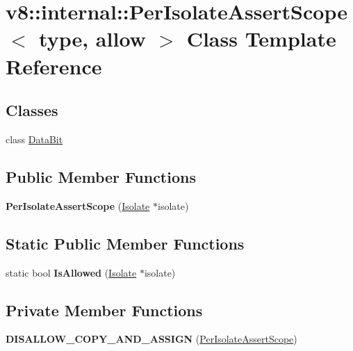 \hypertarget{classv8_1_1internal_1_1_per_isolate_assert_scope}{}\section{v8\+:\+:internal\+:\+:Per\+Isolate\+Assert\+Scope$<$ type, allow $>$ Class Template Reference}
\label{classv8_1_1internal_1_1_per_isolate_assert_scope}
\subsection*{Classes}
\begin{DoxyCompactItemize}
\item 
class \hyperlink{classv8_1_1internal_1_1_per_isolate_assert_scope_1_1_data_bit}{Data\+Bit}
\end{DoxyCompactItemize}
\subsection*{Public Member Functions}
\begin{DoxyCompactItemize}
\item 
{\bfseries Per\+Isolate\+Assert\+Scope} (\hyperlink{classv8_1_1internal_1_1_isolate}{Isolate} $\ast$isolate)\hypertarget{classv8_1_1internal_1_1_per_isolate_assert_scope_afbc3795af325ea428c90ef81665cb5e2}{}\label{classv8_1_1internal_1_1_per_isolate_assert_scope_afbc3795af325ea428c90ef81665cb5e2}

\end{DoxyCompactItemize}
\subsection*{Static Public Member Functions}
\begin{DoxyCompactItemize}
\item 
static bool {\bfseries Is\+Allowed} (\hyperlink{classv8_1_1internal_1_1_isolate}{Isolate} $\ast$isolate)\hypertarget{classv8_1_1internal_1_1_per_isolate_assert_scope_a11578ac71c68b5d24a690956e50b740f}{}\label{classv8_1_1internal_1_1_per_isolate_assert_scope_a11578ac71c68b5d24a690956e50b740f}

\end{DoxyCompactItemize}
\subsection*{Private Member Functions}
\begin{DoxyCompactItemize}
\item 
{\bfseries D\+I\+S\+A\+L\+L\+O\+W\+\_\+\+C\+O\+P\+Y\+\_\+\+A\+N\+D\+\_\+\+A\+S\+S\+I\+GN} (\hyperlink{classv8_1_1internal_1_1_per_isolate_assert_scope}{Per\+Isolate\+Assert\+Scope})\hypertarget{classv8_1_1internal_1_1_per_isolate_assert_scope_a2e6f9fb960700cb1b9c4bd4697b8daed}{}\label{classv8_1_1internal_1_1_per_isolate_assert_scope_a2e6f9fb960700cb1b9c4bd4697b8daed}

\end{DoxyCompactItemize}
